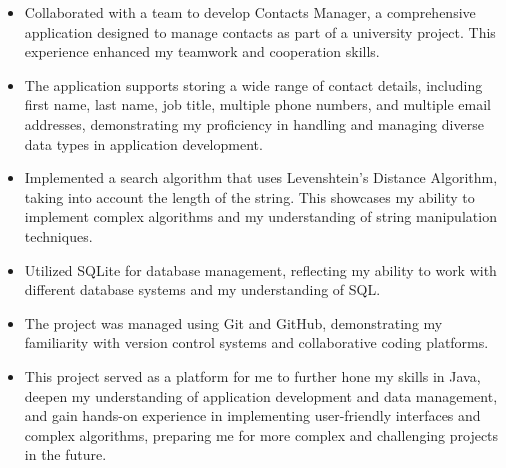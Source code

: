 \documentclass[10pt,a4paper]{altacv}
\begin{document}
\begin{itemize}
    \item Collaborated with a team to develop Contacts Manager, a comprehensive application designed to manage contacts as part of a university project. This experience enhanced my teamwork and cooperation skills.
    \item The application supports storing a wide range of contact details, including first name, last name, job title, multiple phone numbers, and multiple email addresses, demonstrating my proficiency in handling and managing diverse data types in application development.
    \item Implemented a search algorithm that uses Levenshtein's Distance Algorithm, taking into account the length of the string. This showcases my ability to implement complex algorithms and my understanding of string manipulation techniques.
    \item Utilized SQLite for database management, reflecting my ability to work with different database systems and my understanding of SQL.
    \item The project was managed using Git and GitHub, demonstrating my familiarity with version control systems and collaborative coding platforms.
    \item This project served as a platform for me to further hone my skills in Java, deepen my understanding of application development and data management, and gain hands-on experience in implementing user-friendly interfaces and complex algorithms, preparing me for more complex and challenging projects in the future.
\end{itemize}




\clearpage

\end{document}
